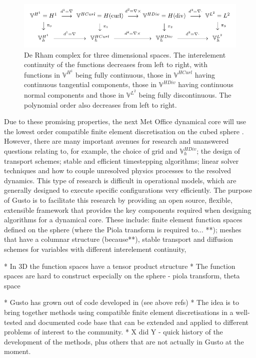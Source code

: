 \documentclass[journal abbreviation, manuscript]{copernicus}
\begin{document}
\begin{figure}
  \includegraphics{figures/de_rham_fig_3d.pdf}
  \caption{De Rham complex for three dimensional spaces. The
    interelement continuity of the functions decreases from left to
    right, with functions in $\mathbb{V}^{H^1}$ being fully
    continuous, those in $\mathbb{V}^{HCurl}$ having continuous
    tangential components, those in $\mathbb{V}^{HDiv}$ having
    continuous normal components and those in $\mathbb{V}^{L^2}$ being
    fully discontinuous. The polynomial order also decreases from left
    to right.}
  \label{fig:3DdeRham}
\end{figure}

Due to these promising properties, the next Met Office dynamical core
will use the lowest order compatible finite element discretisation on
the cubed sphere \citep{}. However, there are many important avenues
for research and unanswered questions relating to, for example, the
choice of grid and $\mathbb{V}^{HDiv}_h$; the design of transport
schemes; stable and efficient timestepping algorithms; linear solver
techniques and how to couple unresolved physics processes to the
resolved dynamics. This type of research is difficult in operational
models, which are generally designed to execute specific
configurations very efficiently. The purpose of Gusto is to facilitate
this research by providing an open source, flexible, extensible
framework that provides the key components required when designing
algorithms for a dynamical core. These include: finite element
function spaces defined on the sphere (where the Piola transform is
required to... **); meshes that have a columnar structure (because**),
stable transport and diffusion schemes for variables with different
interelement continuity,



* In 3D the function spaces have a tensor product structure
* The function spaces are hard to construct especially on the sphere - piola transform, theta space

* Gusto has grown out of code developed in (see above refs)
* The idea is to bring together methods using compatible finite element discretisations in a well-tested and documented code base that can be extended and applied to different problems of interest to the community.
* X did Y - quick history of the development of the methods, plus others that are not actually in Gusto at the moment.
\end{document}
